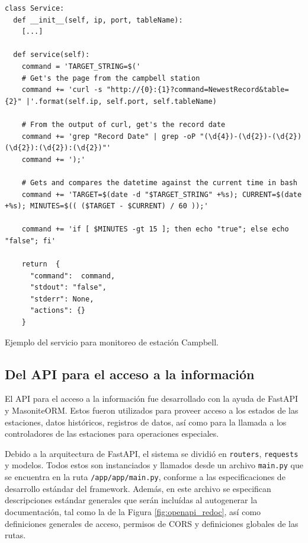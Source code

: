 \begin{listing}
\begin{verbatim}
class Service:
  def __init__(self, ip, port, tableName):
    [...]

  def service(self):
    command = 'TARGET_STRING=$('
    # Get's the page from the campbell station
    command += 'curl -s "http://{0}:{1}?command=NewestRecord&table={2}" |'.format(self.ip, self.port, self.tableName)

    # From the output of curl, get's the record date
    command += 'grep "Record Date" | grep -oP "(\d{4})-(\d{2})-(\d{2}) (\d{2}):(\d{2}):(\d{2})"'
    command += ');'

    # Gets and compares the datetime against the current time in bash
    command += 'TARGET=$(date -d "$TARGET_STRING" +%s); CURRENT=$(date +%s); MINUTES=$(( ($TARGET - $CURRENT) / 60 ));'

    command += 'if [ $MINUTES -gt 15 ]; then echo "true"; else echo "false"; fi'

    return  {
      "command":  command,
      "stdout": "false",
      "stderr": None,
      "actions": {}
    }
\end{verbatim}
\caption{Ejemplo del servicio para monitoreo de estación Campbell.}
\label{lst:campbell_service}
\end{listing}

\clearpage

\subsection{Del API para el acceso a la información}

El API para el acceso a la información fue desarrollado con la ayuda de FastAPI y MasoniteORM. Estos fueron utilizados para proveer acceso a los estados de las estaciones, datos históricos, registros de datos, así como para la llamada a los controladores de las estaciones para operaciones especiales.

Debido a la arquitectura de FastAPI, el sistema se dividió en \texttt{routers}, \texttt{requests} y modelos. Todos estos son instanciados y llamados desde un archivo \texttt{main.py} que se encuentra en la ruta \texttt{/app/app/main.py}, conforme a las especificaciones de desarrollo estándar del framework. Además, en este archivo se especifican descripciones estándar generales que serán incluídas al autogenerar la documentación, tal como la de la Figura \ref{fig:openapi_redoc}, así como definiciones generales de acceso, permisos de CORS y definiciones globales de las rutas.

